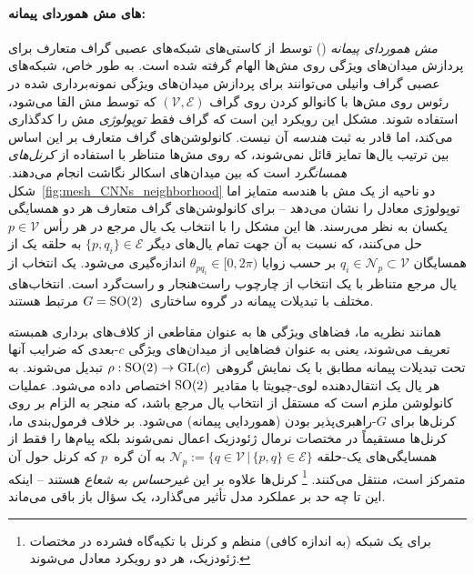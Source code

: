 \paragraph{های مش هموردای پیمانه:}
\emph{ مش هموردای پیمانه} () توسط \citet{deHaan2020meshCNNs} از کاستی‌های شبکه‌های عصبی گراف متعارف برای پردازش میدان‌های ویژگی روی مش‌ها الهام گرفته شده است.
به طور خاص، شبکه‌های عصبی گراف وانیلی می‌توانند برای پردازش میدان‌های ویژگی نمونه‌برداری شده در رئوس روی مش‌ها با کانوالو کردن روی گراف $(\mathcal{V},\mathcal{E})$ که توسط مش القا می‌شود، استفاده شوند.
مشکل این رویکرد این است که گراف فقط \emph{توپولوژی} مش را کدگذاری می‌کند، اما قادر به ثبت \emph{هندسه} آن نیست.
کانولوشن‌های گراف متعارف بر این اساس بین ترتیب یال‌ها تمایز قائل نمی‌شوند، که روی مش‌ها متناظر با استفاده از \emph{کرنل‌های همسانگرد} است که بین میدان‌های اسکالر نگاشت انجام می‌دهند.
شکل~\ref{fig:mesh_CNNs_neighborhood} دو ناحیه از یک مش با هندسه متمایز اما توپولوژی معادل را نشان می‌دهد -- برای کانولوشن‌های گراف متعارف هر دو همسایگی یکسان به نظر می‌رسند.
ها این مشکل را با انتخاب یک یال مرجع در هر رأس $p\in\mathcal{V}$ حل می‌کنند، که نسبت به آن جهت تمام یال‌های دیگر $\{p,q_i\} \in\mathcal{E}$ به حلقه یک از همسایگان $q_i\in \mathcal{N}_p \subset\mathcal{V}$ بر حسب زوایا $\theta_{pq_i} \in [0,2\pi)$ اندازه‌گیری می‌شود.
یک انتخاب از یال مرجع متناظر با یک انتخاب از چارچوب راست‌هنجار و راست‌گرد است.
انتخاب‌های مختلف با تبدیلات پیمانه در گروه ساختاری~$G=\operatorname{SO}(2)$ مرتبط هستند.

همانند نظریه ما، فضاهای ویژگی ها به عنوان مقاطعی از کلاف‌های برداری همبسته تعریف می‌شوند، یعنی به عنوان فضاهایی از میدان‌های ویژگی $c$-بعدی که ضرایب آنها تحت تبدیلات پیمانه مطابق با یک نمایش گروهی $\rho: \operatorname{SO}(2) \to \operatorname{GL}(c)$ تبدیل می‌شوند.
به هر یال یک انتقال‌دهنده لوی-چیویتا با مقادیر $\operatorname{SO}(2)$ اختصاص داده می‌شود.
عملیات کانولوشن ملزم است که مستقل از انتخاب یال مرجع باشد، که منجر به الزام بر روی کرنل‌ها برای $G$-راهبری‌پذیر بودن (هموردایی پیمانه) می‌شود.
بر خلاف فرمول‌بندی ما، کرنل‌ها مستقیماً در مختصات نرمال ژئودزیک اعمال نمی‌شوند بلکه پیام‌ها را فقط از همسایگی‌های یک-حلقه $\mathcal{N}_p := \{q\in\mathcal{V} \,|\, \{p,q\}\in\mathcal{E} \}$ به آن گره~$p$ که کرنل حول آن متمرکز است، منتقل می‌کنند.%
\footnote{
    برای یک شبکه (به اندازه کافی) منظم و کرنل با تکیه‌گاه فشرده در مختصات ژئودزیک، هر دو رویکرد معادل می‌شوند.
}
کرنل‌ها علاوه بر این \emph{غیرحساس به شعاع} هستند -- اینکه این تا چه حد بر عملکرد مدل تأثیر می‌گذارد، یک سؤال باز باقی می‌ماند.

